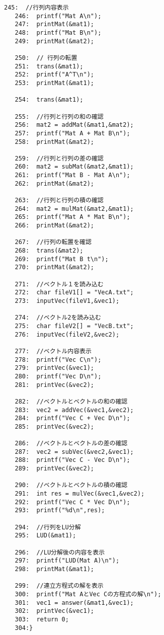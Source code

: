 \documentclass[12pt,a4j]{jarticle}
\begin{document}
\begin{lstlisting}[basicstyle=\ttfamily,breaklines=true,frame=single]
   245:  //行列内容表示
   246:  printf("Mat A\n");
   247:  printMat(&mat1);
   248:  printf("Mat B\n");
   249:  printMat(&mat2);
       
   250:  // 行列の転置
   251:  trans(&mat1);
   252:  printf("A^T\n");
   253:  printMat(&mat1);
       
   254:  trans(&mat1);
       
   255:  //行列と行列の和の確認
   256:  mat2 = addMat(&mat1,&mat2);
   257:  printf("Mat A + Mat B\n");
   258:  printMat(&mat2);
       
   259:  //行列と行列の差の確認
   260:  mat2 = subMat(&mat2,&mat1);
   261:  printf("Mat B - Mat A\n");
   262:  printMat(&mat2);
       
   263:  //行列と行列の積の確認
   264:  mat2 = mulMat(&mat2,&mat1);
   265:  printf("Mat A * Mat B\n");
   266:  printMat(&mat2);
       
   267:  //行列の転置を確認
   268:  trans(&mat2);
   269:  printf("Mat B t\n");
   270:  printMat(&mat2);
       
   271:  //ベクトル１を読み込む
   272:  char fileV1[] = "VecA.txt";
   273:  inputVec(fileV1,&vec1);
       
   274:  //ベクトル2を読み込む
   275:  char fileV2[] = "VecB.txt";
   276:  inputVec(fileV2,&vec2);
       
   277:  //ベクトル内容表示
   278:  printf("Vec C\n");
   279:  printVec(&vec1);
   280:  printf("Vec D\n");
   281:  printVec(&vec2);
       
   282:  //ベクトルとベクトルの和の確認
   283:  vec2 = addVec(&vec1,&vec2);
   284:  printf("Vec C + Vec D\n");
   285:  printVec(&vec2);
       
   286:  //ベクトルとベクトルの差の確認
   287:  vec2 = subVec(&vec2,&vec1);
   288:  printf("Vec C - Vec D\n");
   289:  printVec(&vec2);
       
   290:  //ベクトルとベクトルの積の確認
   291:  int res = mulVec(&vec1,&vec2);
   292:  printf("Vec C * Vec D\n");
   293:  printf("%d\n",res);
       
   294:  //行列をLU分解
   295:  LUD(&mat1);
       
   296:  //LU分解後の内容を表示
   297:  printf("LUD(Mat A)\n");
   298:  printMat(&mat1);
       
   299:  //連立方程式の解を表示
   300:  printf("Mat AとVec Cの方程式の解\n");
   301:  vec1 = answer(&mat1,&vec1);
   302:  printVec(&vec1);
   303:  return 0;
   304:}
\end{lstlisting}
\end{document}
